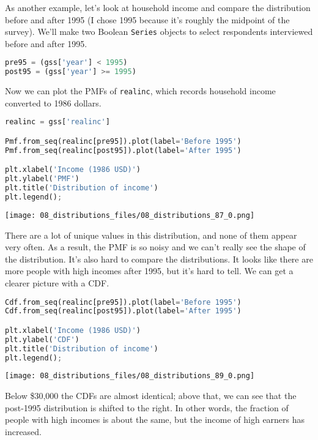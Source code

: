 As another example, let's look at household income and compare the
distribution before and after 1995 (I chose 1995 because it's roughly
the midpoint of the survey). We'll make two Boolean
\passthrough{\lstinline!Series!} objects to select respondents
interviewed before and after 1995.

\begin{lstlisting}[language=Python,style=source]
pre95 = (gss['year'] < 1995)
post95 = (gss['year'] >= 1995)
\end{lstlisting}

Now we can plot the PMFs of \passthrough{\lstinline!realinc!}, which
records household income converted to 1986 dollars.

\begin{lstlisting}[language=Python,style=source]
realinc = gss['realinc']

Pmf.from_seq(realinc[pre95]).plot(label='Before 1995')
Pmf.from_seq(realinc[post95]).plot(label='After 1995')

plt.xlabel('Income (1986 USD)')
plt.ylabel('PMF')
plt.title('Distribution of income')
plt.legend();
\end{lstlisting}

\begin{center}
\texttt{[image: 08\_distributions\_files/08\_distributions\_87\_0.png]}
\end{center}

There are a lot of unique values in this distribution, and none of them
appear very often. As a result, the PMF is so noisy and we can't really
see the shape of the distribution. It's also hard to compare the
distributions. It looks like there are more people with high incomes
after 1995, but it's hard to tell. We can get a clearer picture with a
CDF.

\begin{lstlisting}[language=Python,style=source]
Cdf.from_seq(realinc[pre95]).plot(label='Before 1995')
Cdf.from_seq(realinc[post95]).plot(label='After 1995')

plt.xlabel('Income (1986 USD)')
plt.ylabel('CDF')
plt.title('Distribution of income')
plt.legend();
\end{lstlisting}

\begin{center}
\texttt{[image: 08\_distributions\_files/08\_distributions\_89\_0.png]}
\end{center}

Below \$30,000 the CDFs are almost identical; above that, we can see
that the post-1995 distribution is shifted to the right. In other words,
the fraction of people with high incomes is about the same, but the
income of high earners has increased.

